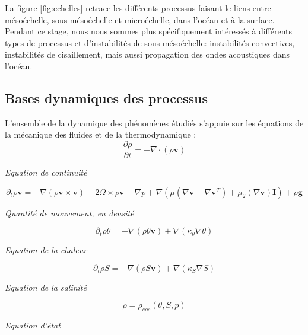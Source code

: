 \documentclass{rapportECC}
\begin{document}
La figure \ref{fig:echelles} retrace les différents processus faisant le liens entre mésoéchelle, sous-mésoéchelle et microéchelle, dans l'océan et à la surface. Pendant ce stage, nous nous sommes plus spécifiquement intéressés à différents types de processus et d'instabilités de sous-mésoéchelle: instabilités convectives, instabilités de cisaillement, mais aussi propagation des ondes acoustiques dans l'océan.
\\


\subsection{Bases dynamiques des processus}
\label{Dynamiques globales}
L'ensemble de la dynamique des phénomènes étudiés s'appuie sur les équations de la mécanique des fluides et de la thermodynamique :
\begin{equation}
    \frac{\partial \rho}{\partial t} = - \nabla \cdot (\rho \mathbf{v})
    \label{eq:continuite}
\end{equation}
\begin{center}
    \textit{Equation de continuité}
\end{center}
\begin{equation}
    \partial_t \rho \mathbf{v} = - \nabla (\rho \mathbf{v} \times \mathbf{v}) - 2\Omega \times \rho \mathbf{v} - \nabla p + \nabla (\mu (\nabla\mathbf{v} + \nabla\mathbf{v}^T) + \mu_2(\nabla \mathbf{v}) \mathbf{I}) +\rho \mathbf{g}
    \label{eq: qtt de mouvement}
\end{equation}
\begin{center}
    \textit{Quantité de mouvement, en densité}
\end{center}


\begin{equation}
    \partial_t \rho \theta = -\nabla(\rho\theta\mathbf{v}) + \nabla(\kappa_{\theta}\nabla\theta)
    \label{eq:chaleur}
\end{equation}
\begin{center}
    \textit{Equation de la chaleur}
\end{center}

\begin{equation}
    \partial_t \rho S = -\nabla(\rho S\mathbf{v}) + \nabla(\kappa_S\nabla S)
    \label{eq:salinite}
\end{equation}
\begin{center}
    \textit{Equation de la salinité} 
\end{center}
\begin{equation}
    \rho = \rho_{eos}(\theta , S, p)
    \label{eq:etat}
\end{equation}
\begin{center}
    \textit{Equation d'état}
\end{center}
\end{document}
